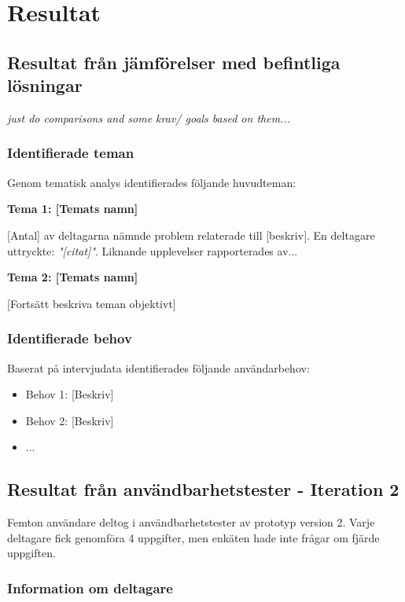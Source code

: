 \section{Resultat}
\label{sec:resultat_test}

\subsection{Resultat från jämförelser med befintliga lösningar}

\textit{just do comparisons and some krav/ goals based on them...}


\subsubsection{Identifierade teman}

Genom tematisk analys identifierades följande huvudteman:

\textbf{Tema 1: [Temats namn]}

[Antal] av deltagarna nämnde problem relaterade till [beskriv]. En deltagare uttryckte: \textit{"[citat]"}. Liknande upplevelser rapporterades av...

\textbf{Tema 2: [Temats namn]}

[Fortsätt beskriva teman objektivt]


\subsubsection{Identifierade behov}

Baserat på intervjudata identifierades följande användarbehov:
\begin{itemize}
    \item Behov 1: [Beskriv]
    \item Behov 2: [Beskriv]
    \item ...
\end{itemize}


\subsection{Resultat från användbarhetstester - Iteration 2}

Femton användare deltog i användbarhetstester av prototyp version 2. Varje deltagare fick genomföra 4 uppgifter, men enkäten hade inte frågar om fjärde uppgiften. 

\subsubsection{Information om deltagare}

